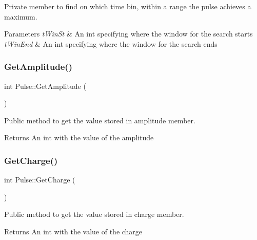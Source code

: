 Private member to find on which time bin, within a range the pulse achieves a maximum. 


\begin{DoxyParams}{Parameters}
{\em t\+Win\+St} & An int specifying where the window for the search starts \\
\hline
{\em t\+Win\+End} & An int specifying where the window for the search ends \\
\hline
\end{DoxyParams}
\mbox{\label{classPulse_a89afa9f7773d73122d7b0926382e30d3}} 
\subsubsection{\texorpdfstring{Get\+Amplitude()}{GetAmplitude()}}
{\footnotesize\ttfamily int Pulse\+::\+Get\+Amplitude (\begin{DoxyParamCaption}{ }\end{DoxyParamCaption})}



Public method to get the value stored in amplitude member. 

\begin{DoxyReturn}{Returns}
An int with the value of the amplitude 
\end{DoxyReturn}
\mbox{\label{classPulse_a74658eb6ed6d5ad2dadf3e3642a687a2}} 
\subsubsection{\texorpdfstring{Get\+Charge()}{GetCharge()}}
{\footnotesize\ttfamily int Pulse\+::\+Get\+Charge (\begin{DoxyParamCaption}{ }\end{DoxyParamCaption})}



Public method to get the value stored in charge member. 

\begin{DoxyReturn}{Returns}
An int with the value of the charge 
\end{DoxyReturn}
\mbox{\label{classPulse_a4f92bb4c6f55908515a6bffdac10e81e}} 
